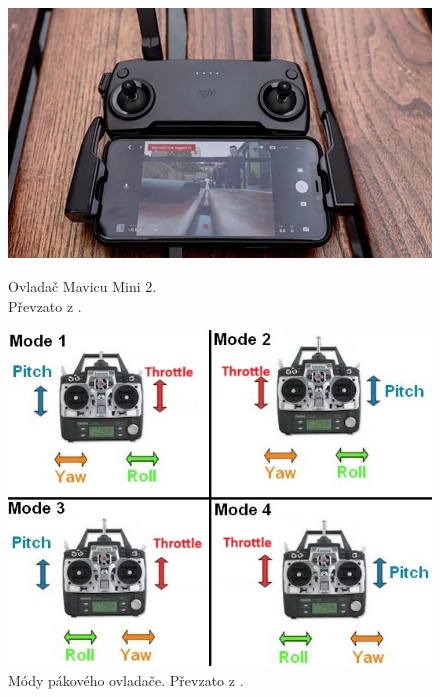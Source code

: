 \begin{figure}[h]
  \begin{minipage}{0.55\textwidth}
    \centering
    \includegraphics[width=\textwidth]{obrazky-figures/drony/controler.jpg}
    \caption{Ovladač Mavicu Mini 2.\\ Převzato z \cite{pakaOvladac}.} %
    \label{pic:paka}
  \end{minipage}
  \hfill
  \begin{minipage}{0.4\textwidth}
    \centering
    \includegraphics[width=\textwidth]{obrazky-figures/drony/transmiterMods.jpg}
    \caption{Módy pákového ovladače. Převzato z \cite{pakaMody}.} %
    \label{pic:pakaMody}
  \end{minipage}
\end{figure}

